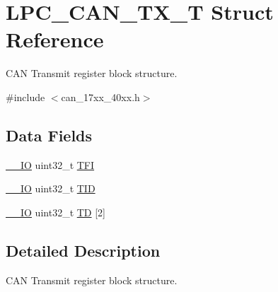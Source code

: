 \hypertarget{structLPC__CAN__TX__T}{\section{L\-P\-C\-\_\-\-C\-A\-N\-\_\-\-T\-X\-\_\-\-T Struct Reference}
\label{structLPC__CAN__TX__T}
}


C\-A\-N Transmit register block structure.  




{\ttfamily \#include $<$can\-\_\-17xx\-\_\-40xx.\-h$>$}

\subsection*{Data Fields}
\begin{DoxyCompactItemize}
\item 
\hyperlink{core__cm3_8h_aec43007d9998a0a0e01faede4133d6be}{\-\_\-\-\_\-\-I\-O} uint32\-\_\-t \hyperlink{structLPC__CAN__TX__T_a10a4c2076dd63148d4e9e4ad32af1451}{T\-F\-I}
\item 
\hyperlink{core__cm3_8h_aec43007d9998a0a0e01faede4133d6be}{\-\_\-\-\_\-\-I\-O} uint32\-\_\-t \hyperlink{structLPC__CAN__TX__T_a7a98a061fcb602592c5b6a17810a42c3}{T\-I\-D}
\item 
\hyperlink{core__cm3_8h_aec43007d9998a0a0e01faede4133d6be}{\-\_\-\-\_\-\-I\-O} uint32\-\_\-t \hyperlink{structLPC__CAN__TX__T_ab41475b9f2b0952da4e71f74cfe33c20}{T\-D} \mbox{[}2\mbox{]}
\end{DoxyCompactItemize}


\subsection{Detailed Description}
C\-A\-N Transmit register block structure. 

